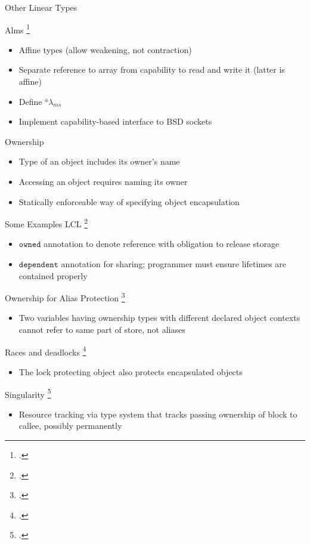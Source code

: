\documentclass[aspectratio=169]{beamer}
\begin{document}
\begin{frame}{Other Linear Types}
\begin{itemize}
    \end{itemize}
  Alms \footcite{tov_practical_2011}
    \begin{itemize}
        \item Affine types (allow weakening, not contraction) %
        \item Separate reference to array from capability to read and write it (latter is affine)
        \item Define $^{a}\lambda_{ms}$
        \item Implement capability-based interface to BSD sockets %
    \end{itemize}
\end{frame}

\begin{frame}{Ownership}
    \begin{itemize}
      \item Type of an object includes its owner's name
      \item Accessing an object requires naming its owner
      \item Statically enforceable way of specifying object encapsulation %
    \end{itemize}
\end{frame}

\begin{frame}{Some Examples}
  LCL \footcite{evans_static_1996}
    \begin{itemize}
        \item $\texttt{owned}$ annotation to denote reference with obligation to release storage
        \item $\texttt{dependent}$ annotation for sharing; programmer must ensure lifetimes are contained properly %
    \end{itemize}
  Ownership for Alias Protection \footcite{clarke_ownership_1998}
    \begin{itemize}
      \item Two variables having ownership types with different declared object contexts cannot refer to same part of store, not aliases
    \end{itemize}
  Races and deadlocks \footcite{boyapati_ownership_2002}
    \begin{itemize}
      \item The lock protecting object also protects encapsulated objects
    \end{itemize}
  Singularity \footcite{fahndrich_language_2006}
    \begin{itemize}
        \item Resource tracking via type system that tracks passing ownership of block to callee, possibly permanently
    \end{itemize}
\end{frame}
\end{document}
